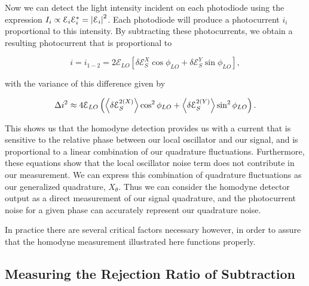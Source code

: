 \noindent
Now we can detect the light intensity incident on each photodiode using the expression $I_i \propto \mathcal{E}_{i} \mathcal{E}^*_{i} = \left| \mathcal{E}_{i} \right|^2$.  Each photodiode will produce a photocurrent $i_i$ proportional to this intensity.  By subtracting these photocurrents, we obtain a resulting photocurrent that is proportional to 

\begin{equation}
  \label{eq:homodyne_photocurrent}
  i = i_{1-2} =  2 \mathcal{E}_{LO} \left[ \delta \mathcal{E}^X_{S} \cos \phi_{LO}   + \delta \mathcal{E}^Y_{S} \sin \phi_{LO}  \right],
\end{equation}

\noindent
with the variance of this difference given by 

\begin{equation}
  \label{eq:homodyne_photo_variance}
  \Delta i^2 \approx 4 \mathcal{E}_{LO}\left(\left< \delta \mathcal{E}^{2(X)}_{S} \right> \cos^2 \phi_{LO}  + \left< \delta \mathcal{E}^{2(Y)}_{S}  \right> \sin^2 \phi_{LO}   \right).
\end{equation}

This shows us that the homodyne detection provides us with a current that is sensitive to the relative phase between our local oscillator and our signal, and is proportional to a linear combination of our quadrature fluctuations.  Furthermore, these equations show that the local oscillator noise term does not contribute in our measurement.  We can express this combination of quadrature fluctuations as our generalized quadrature, $X_\theta$.  Thus we can consider the homodyne detector output as a direct measurement of our signal quadrature, and the photocurrent noise for a given phase can accurately represent our quadrature noise.

In practice there are several critical factors necessary however, in order to assure that the homodyne measurement illustrated here functions properly.


\subsection{Measuring the Rejection Ratio of Subtraction} 
\label{measuring_the_rejection_ratio_of_subtraction} 

